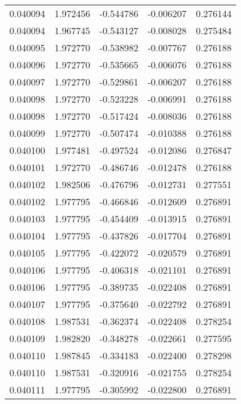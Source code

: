 \begin{tabular}{lrrrr}
0.040094    &  1.972456 & -0.544786 & -0.006207 &             0.276144 \\
0.040094    &  1.967745 & -0.543127 & -0.008028 &             0.275484 \\
0.040095    &  1.972770 & -0.538982 & -0.007767 &             0.276188 \\
0.040096    &  1.972770 & -0.535665 & -0.006076 &             0.276188 \\
0.040097    &  1.972770 & -0.529861 & -0.006207 &             0.276188 \\
0.040098    &  1.972770 & -0.523228 & -0.006991 &             0.276188 \\
0.040098    &  1.972770 & -0.517424 & -0.008036 &             0.276188 \\
0.040099    &  1.972770 & -0.507474 & -0.010388 &             0.276188 \\
0.040100    &  1.977481 & -0.497524 & -0.012086 &             0.276847 \\
0.040101    &  1.972770 & -0.486746 & -0.012478 &             0.276188 \\
0.040102    &  1.982506 & -0.476796 & -0.012731 &             0.277551 \\
0.040102    &  1.977795 & -0.466846 & -0.012609 &             0.276891 \\
0.040103    &  1.977795 & -0.454409 & -0.013915 &             0.276891 \\
0.040104    &  1.977795 & -0.437826 & -0.017704 &             0.276891 \\
0.040105    &  1.977795 & -0.422072 & -0.020579 &             0.276891 \\
0.040106    &  1.977795 & -0.406318 & -0.021101 &             0.276891 \\
0.040106    &  1.977795 & -0.389735 & -0.022408 &             0.276891 \\
0.040107    &  1.977795 & -0.375640 & -0.022792 &             0.276891 \\
0.040108    &  1.987531 & -0.362374 & -0.022408 &             0.278254 \\
0.040109    &  1.982820 & -0.348278 & -0.022661 &             0.277595 \\
0.040110    &  1.987845 & -0.334183 & -0.022400 &             0.278298 \\
0.040110    &  1.987531 & -0.320916 & -0.021755 &             0.278254 \\
0.040111    &  1.977795 & -0.305992 & -0.022800 &             0.276891 \\

\end{tabular}
